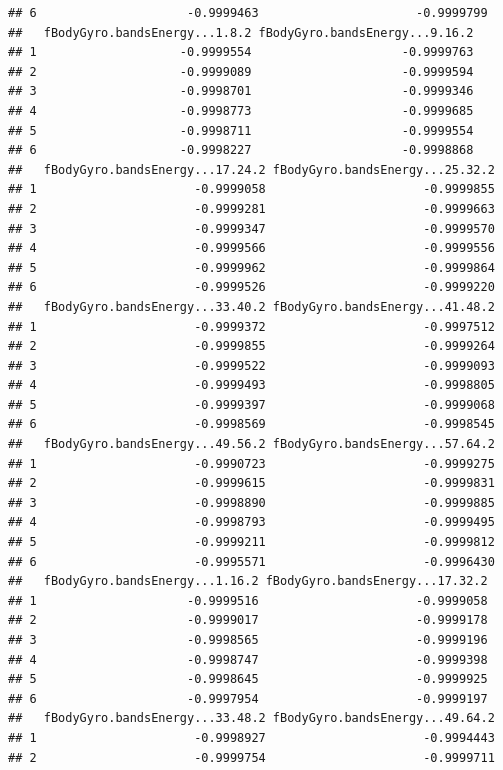 \documentclass[
]{article}
\begin{document}
\begin{verbatim}
## 6                     -0.9999463                      -0.9999799
##   fBodyGyro.bandsEnergy...1.8.2 fBodyGyro.bandsEnergy...9.16.2
## 1                    -0.9999554                     -0.9999763
## 2                    -0.9999089                     -0.9999594
## 3                    -0.9998701                     -0.9999346
## 4                    -0.9998773                     -0.9999685
## 5                    -0.9998711                     -0.9999554
## 6                    -0.9998227                     -0.9998868
##   fBodyGyro.bandsEnergy...17.24.2 fBodyGyro.bandsEnergy...25.32.2
## 1                      -0.9999058                      -0.9999855
## 2                      -0.9999281                      -0.9999663
## 3                      -0.9999347                      -0.9999570
## 4                      -0.9999566                      -0.9999556
## 5                      -0.9999962                      -0.9999864
## 6                      -0.9999526                      -0.9999220
##   fBodyGyro.bandsEnergy...33.40.2 fBodyGyro.bandsEnergy...41.48.2
## 1                      -0.9999372                      -0.9997512
## 2                      -0.9999855                      -0.9999264
## 3                      -0.9999522                      -0.9999093
## 4                      -0.9999493                      -0.9998805
## 5                      -0.9999397                      -0.9999068
## 6                      -0.9998569                      -0.9998545
##   fBodyGyro.bandsEnergy...49.56.2 fBodyGyro.bandsEnergy...57.64.2
## 1                      -0.9990723                      -0.9999275
## 2                      -0.9999615                      -0.9999831
## 3                      -0.9998890                      -0.9999885
## 4                      -0.9998793                      -0.9999495
## 5                      -0.9999211                      -0.9999812
## 6                      -0.9995571                      -0.9996430
##   fBodyGyro.bandsEnergy...1.16.2 fBodyGyro.bandsEnergy...17.32.2
## 1                     -0.9999516                      -0.9999058
## 2                     -0.9999017                      -0.9999178
## 3                     -0.9998565                      -0.9999196
## 4                     -0.9998747                      -0.9999398
## 5                     -0.9998645                      -0.9999925
## 6                     -0.9997954                      -0.9999197
##   fBodyGyro.bandsEnergy...33.48.2 fBodyGyro.bandsEnergy...49.64.2
## 1                      -0.9998927                      -0.9994443
## 2                      -0.9999754                      -0.9999711

\end{verbatim}
\end{document}
